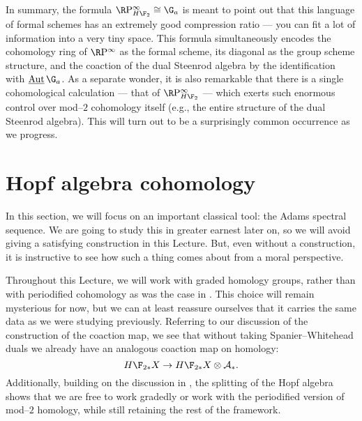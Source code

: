In summary, the formula $\RP^\infty_{H\F_2} \cong \G_a$ is meant to point out that this language of formal schemes has an extremely good compression ratio --- you can fit a lot of information into a very tiny space.  This formula simultaneously encodes the cohomology ring of $\RP^\infty$ as the formal scheme, its diagonal as the group scheme structure, and the coaction of the dual Steenrod algebra by the identification with $\InternalAut{\G_a}$.  As a separate wonder, it is also remarkable that there is a single cohomological calculation --- that of $\RP^\infty_{H\F_2}$ --- which exerts such enormous control over mod--$2$ cohomology itself (e.g., the entire structure of the dual Steenrod algebra).  This will turn out to be a surprisingly common occurrence as we progress.








\section{Hopf algebra cohomology}\label{HopfAlgebraLecture}

In this section, we will focus on an important classical tool: the Adams spectral sequence.  We are going to study this in greater earnest later on, so we will avoid giving a satisfying construction in this Lecture.  But, even without a construction, it is instructive to see how such a thing comes about from a moral perspective.  

\begin{remark}
Throughout this Lecture, we will work with graded homology groups, rather than with periodified cohomology as was the case in .  This choice will remain mysterious for now, but we can at least reassure ourselves that it carries the same data as we were studying previously.  Referring to our discussion of the construction of the coaction map, we see that without taking Spanier--Whitehead duals we already have an analogous coaction map on homology: \[H\F_{2*} X \to H\F_{2*} X \otimes \mathcal A_*.\]  Additionally, building on the discussion in , the splitting of the Hopf algebra shows that we are free to work gradedly or work with the periodified version of mod--$2$ homology, while still retaining the rest of the framework.
\end{remark}

